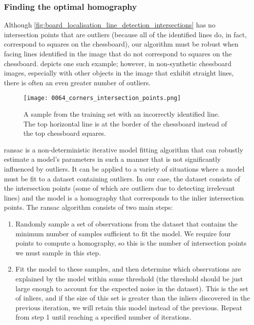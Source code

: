 \documentclass[../main.tex]{subfiles}
\begin{document}
\subsubsection{Finding the optimal homography}
\label{sec:find_optimal_homography}
Although \cref{fig:board_localisation_line_detection_intersections} has no intersection points that are outliers (because all of the identified lines do, in fact, correspond to squares on the chessboard), our algorithm must be robust when facing lines identified in the image that do not correspond to squares on the chessboard.
 depicts one such example; however, in non-synthetic chessboard images, especially with other objects in the image that exhibit straight lines, there is often an even greater number of outliers. 
\begin{figure}
    \centering
    \texttt{[image: 0064\_corners\_intersection\_points.png]}    
    \caption[A sample from the training set with an incorrectly identified line.]{A sample from the training set with an incorrectly identified line. The top horizontal line is at the border of the chessboard instead of the top chessboard squares.}
    \label{fig:incorrect_intersection_points}
\end{figure}

\Gls{ransac} \cite{fischler1981} is a non-deterministic iterative model fitting algorithm that can robustly estimate a model's parameters in such a manner that is not significantly influenced by outliers.
It can be applied to a variety of situations where a model must be fit to a dataset containing outliers.
In our case, the dataset consists of the intersection points (some of which are outliers due to detecting irrelevant lines) and the model is a homography that corresponds to the inlier intersection points.
The \gls{ransac} algorithm consists of two main steps:
\begin{enumerate}
    \item \label{enum:ransac_1}
        Randomly sample a set of observations from the dataset that contains the minimum number of samples sufficient to fit the model. 
        We require four points to compute a homography, so this is the number of intersection points we must sample in this step.
    \item \label{enum:ransac_2}
        Fit the model to these samples, and then determine which observations are explained by the model within some threshold (the threshold should be just large enough to account for the expected noise in the dataset). 
        This is the set of inliers, and if the size of this set is greater than the inliers discovered in the previous iteration, we will retain this model instead of the previous.
        Repeat from step 1 until reaching a specified number of iterations.
\end{enumerate}
\end{document}

